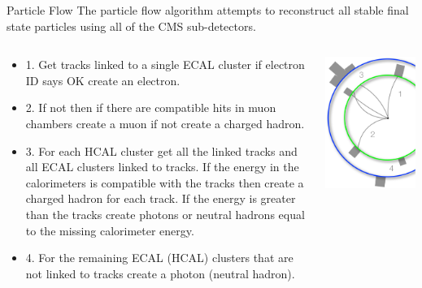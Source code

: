 \begin{frame}{Particle Flow}
The particle flow algorithm attempts to reconstruct all stable final state particles using all of the CMS sub-detectors.

\begin{columns}[T]
  \begin{column}{0.6\textwidth}
    \begin{itemize}
      \footnotesize
    \item
      1. Get tracks linked to a single ECAL cluster if electron ID says OK create an electron.
    \item
      2. If not then if there are compatible hits in muon chambers create a muon if not create a charged hadron.
    \item
      3. For each HCAL cluster get all the linked tracks and all ECAL clusters linked to tracks. If the energy in the calorimeters is compatible with the tracks then create a charged hadron for each track.  If the energy is greater than the tracks create photons or neutral hadrons equal to the missing calorimeter energy.
    \item
      4. For the remaining ECAL (HCAL) clusters that are not linked to tracks create a photon (neutral hadron).
    \end{itemize}
  \end{column}
  \begin{column}{0.40\textwidth}
    \includegraphics[width=0.99\textwidth]{images/pf4.pdf}

\end{column}
\end{columns}
\end{frame}
